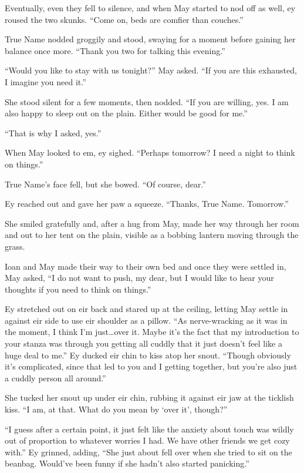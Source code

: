 Eventually, even they fell to silence, and when May started to nod off as well, ey roused the two skunks. ``Come on, beds are comfier than couches.''

True Name nodded groggily and stood, swaying for a moment before gaining her balance once more. ``Thank you two for talking this evening.''

``Would you like to stay with us tonight?'' May asked. ``If you are this exhausted, I imagine you need it.''

She stood silent for a few moments, then nodded. ``If you are willing, yes. I am also happy to sleep out on the plain. Either would be good for me.''

``That is why I asked, yes.''

When May looked to em, ey sighed. ``Perhaps tomorrow? I need a night to think on things.''

True Name's face fell, but she bowed. ``Of course, dear.''

Ey reached out and gave her paw a squeeze. ``Thanks, True Name. Tomorrow.''

She smiled gratefully and, after a hug from May, made her way through her room and out to her tent on the plain, visible as a bobbing lantern moving through the grass.

Ioan and May made their way to their own bed and once they were settled in, May asked, ``I do not want to push, my dear, but I would like to hear your thoughts if you need to think on things.''

Ey stretched out on eir back and stared up at the ceiling, letting May settle in against eir side to use eir shoulder as a pillow. ``As nerve-wracking as it was in the moment, I think I'm just\ldots over it. Maybe it's the fact that my introduction to your stanza was through you getting all cuddly that it just doesn't feel like a huge deal to me.'' Ey ducked eir chin to kiss atop her snout. ``Though obviously it's complicated, since that led to you and I getting together, but you're also just a cuddly person all around.''

She tucked her snout up under eir chin, rubbing it against eir jaw at the ticklish kiss. ``I am, at that. What do you mean by `over it', though?''

``I guess after a certain point, it just felt like the anxiety about touch was wildly out of proportion to whatever worries I had. We have other friends we get cozy with.'' Ey grinned, adding, ``She just about fell over when she tried to sit on the beanbag. Would've been funny if she hadn't also started panicking.''

